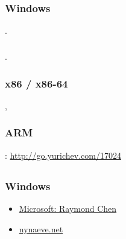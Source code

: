 \part{}
\chapter{}

\section{Windows}

\cite{Russinovich}.

\section{\CCpp}

\cite{CPP11}.

\section{x86 / x86-64}

\cite{Intel}, \cite{AMD}

\section{ARM}

: \url{http://go.yurichev.com/17024}

\chapter{}

\section{Windows}

\begin{itemize}
\item
\href{http://go.yurichev.com/17025}{Microsoft: Raymond Chen}
\item
\href{http://go.yurichev.com/17026}{nynaeve.net}
\end{itemize}

\chapter{}

